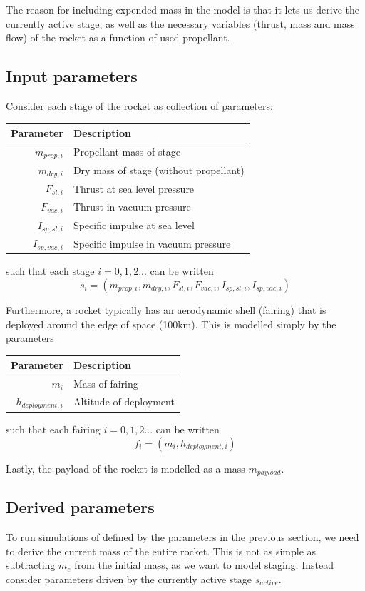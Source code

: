\documentclass[11pt]{article}
\begin{document}
The reason for including expended mass in the model is that it lets us derive the currently active stage, 
as well as the necessary variables (thrust, mass and mass flow) of the rocket as a function of used propellant. 

\subsection{Input parameters}
Consider each stage of the rocket as collection of parameters:
\begin{center}
\begin{tabular}{ r  | l  }
  Parameter & Description \\
  \hline
  $m_{prop,i}$ & Propellant mass of stage \\
  $m_{dry,i}$ & Dry mass of stage (without propellant) \\
  $F_{sl,i}$ & Thrust at sea level pressure \\
  $F_{vac,i}$ & Thrust in vacuum pressure \\
  $I_{sp,sl,i}$ & Specific impulse at sea level \\
  $I_{sp,vac,i}$ & Specific impulse in vacuum pressure
\end{tabular}
\end{center}

such that each stage $i=0,1,2...$ can be written
$$
s_i = (m_{prop,i}, m_{dry,i}, F_{sl,i}, F_{vac,i}, I_{sp,sl,i}, I_{sp,vac,i})
$$

Furthermore, a rocket typically has an aerodynamic shell (fairing) that is deployed around the edge of space (100km). This is modelled simply by the parameters
\begin{center}
  \begin{tabular}{ r  | l  }
    Parameter & Description \\
    \hline
    $m_i$ & Mass of fairing \\
    $h_{deployment,i}$ & Altitude of deployment
  \end{tabular}
\end{center}
such that each fairing $i=0,1,2...$ can be written
$$
f_i = (m_i, h_{deployment,i})
$$

Lastly, the payload of the rocket is modelled as a mass $m_{payload}$.

\subsection{Derived parameters}
To run simulations of defined by the parameters in the previous section, 
we need to derive the current mass of the entire rocket. This is not as simple as subtracting $m_e$ from the initial mass, as we want to model staging.
Instead consider parameters driven by the currently active stage $s_{active}$.
\end{document}
